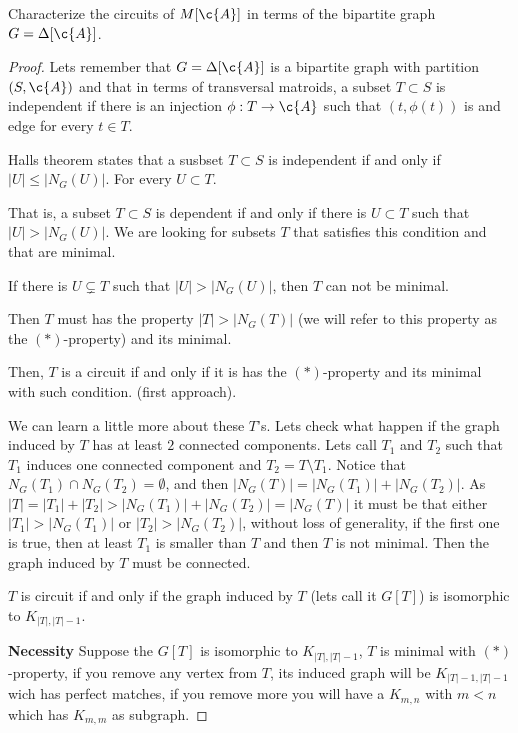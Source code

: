 \prob
{
    Characterize the circuits of $M[\c{A}]$ in terms of the bipartite graph $G = \Delta[\c{A}]$.
}
\begin{proof}
    Lets remember that $G = \Delta[\c{A}]$ is a bipartite graph with partition $(S, \c{A})$ and that
    in terms of transversal matroids, a subset $T \subset S$ is independent if there is an injection
    $\phi : T \rightarrow \c{A}$ such that $(t, \phi(t))$ is and edge for every $t \in T$.\pn
    
    Halls theorem states that a susbset $T \subset S$ is independent if and only if $|U| \leq |N_G(U)|$.
    For every $U \subset T$.\pn
    
    That is, a subset $T \subset S$ is dependent if and only if there is $U \subset T$ such that $|U| > |N_G(U)|$. 
    We are looking for subsets $T$ that satisfies this condition and that are minimal.\pn
    
    If there is $U \subsetneq T$ such that  $|U| > |N_G(U)|$, then $T$ can not be minimal.
    
    Then $T$ must has the property $|T| > |N_G(T)|$ (we will refer to this property as the
    $(*)$-property) and its minimal.\pn

    Then, $T$ is a circuit if and only if it is has the $(*)$-property and its minimal with such condition. (first approach).
    
    We can learn a little more about these $T$'s. Lets check what happen if the graph induced by $T$ has at least 
    $2$ connected components. Lets call $T_1$ and $T_2$ such that $T_1$ induces one connected component and $T_2 = T \setminus T_1$.
    Notice that $N_G(T_1) \cap N_G(T_2) = \emptyset$, and then $|N_G(T)| = |N_G(T_1)| + |N_G(T_2)|$. 
    As $|T| = |T_1| + |T_2| > |N_G(T_1) | + |N_G(T_2)| = |N_G(T)|$ 
    it must be that either $|T_1| > |N_G(T_1)|$ or $|T_2| > |N_G(T_2)|$, without loss of generality, 
    if the first one is true, then at least $T_1$ is smaller than $T$ and then $T$ is not minimal. 
    Then the graph induced by $T$ must be connected.\pn
     
    $T$ is circuit if and only if the graph induced by $T$ (lets call it $G[T]$) is isomorphic to $K_{|T|, |T|-1}$.\pn
    
    \textbf{Necessity}\pn
    Suppose the $G[T]$ is isomorphic to $K_{|T|, |T|-1}$, $T$ is minimal with $(*)$-property, if you remove any vertex from $T$, 
    its induced graph will be $K_{|T|-1, |T|-1}$ wich has perfect matches, if you remove more you will have a $K_{m,n}$ 
    with $m < n$ which has $K_{m, m}$ as subgraph.\pn
    


\end{proof}
